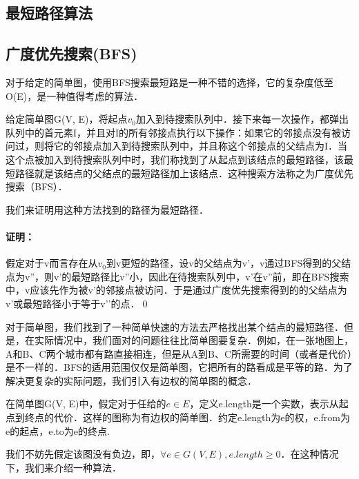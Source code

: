 \documentclass {article}
\begin{document}
\begin {center}
\section {最短路径算法}
\end {center}
\subsection {广度优先搜索(BFS)}
对于给定的简单图，使用BFS搜索最短路是一种不错的选择，它的复杂度低至O(E)，是一种值得考虑的算法．\begin {theorm} 给定简单图G(V, E)，将起点$v_0$加入到待搜索队列中．接下来每一次操作，都弹出队列中的首元素I，并且对I的所有邻接点执行以下操作：如果它的邻接点没有被访问过，则将它的邻接点加入到待搜索队列中，并且称这个邻接点的父结点为I．当这个点被加入到待搜索队列中时，我们称找到了从起点到该结点的最短路径，该最短路径就是该结点的父结点的最短路径加上该结点．这种搜索方法称之为广度优先搜索（BFS）．\end {theorm}
我们来证明用这种方法找到的路径为最短路径．
\paragraph {证明：}
假定对于v而言存在从$v_0$到v更短的路径，设v的父结点为v'，v通过BFS得到的父结点为v''，则v'的最短路径比v''小，因此在待搜索队列中，v'在v''前，即在BFS搜索中，v应该先作为被v'的邻接点被访问．于是通过广度优先搜索得到的的父结点为v'或最短路径小于等于v’'的点．\qed

对于简单图，我们找到了一种简单快速的方法去严格找出某个结点的最短路径．但是，在实际情况中，我们面对的问题往往比简单图要复杂．例如，在一张地图上，A和B、C两个城市都有路直接相连，但是从A到B、C所需要的时间（或者是代价）是不一样的．BFS的适用范围仅仅是简单图，它把所有的路看成是平等的路．为了解决更复杂的实际问题，我们引入有边权的简单图的概念．\begin {define} 在简单图G(V, E)中，假定对于任给的$e\in E$，定义e.length是一个实数，表示从起点到终点的代价．这样的图称为有边权的简单图．约定e.length为e的权，e.from为e的起点，e.to为e的终点.\end {define}

我们不妨先假定该图没有负边，即，$\forall e\in G(V, E), e.length\ge0$．在这种情况下，我们来介绍一种算法．
\end{document}

